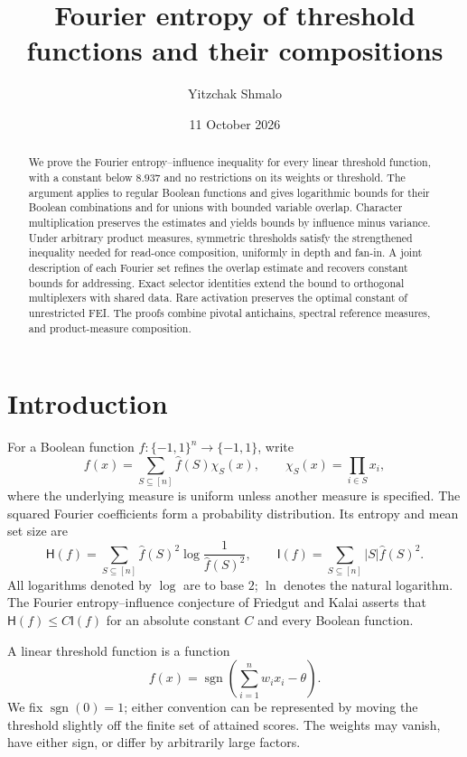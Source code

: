 \documentclass[11pt]{amsart}
\title[Fourier entropy of threshold functions]{Fourier entropy of threshold functions and their compositions}
\author{Yitzchak Shmalo}
\date{11 October 2026}
\theoremstyle{definition}
\theoremstyle{remark}
\newcommand{\bits}{\{-1,1\}}
\newcommand{\HH}{\mathsf H}
\newcommand{\I}{\mathsf I}
\newcommand{\wh}[1]{\widehat{#1}}
\begin{document}
\begin{abstract}
We prove the Fourier entropy--influence inequality for every linear threshold function, with a constant below $8.937$ and no restrictions on its weights or threshold. The argument applies to regular Boolean functions and gives logarithmic bounds for their Boolean combinations and for unions with bounded variable overlap. Character multiplication preserves the estimates and yields bounds by influence minus variance. Under arbitrary product measures, symmetric thresholds satisfy the strengthened inequality needed for read-once composition, uniformly in depth and fan-in. A joint description of each Fourier set refines the overlap estimate and recovers constant bounds for addressing. Exact selector identities extend the bound to orthogonal multiplexers with shared data. Rare activation preserves the optimal constant of unrestricted FEI. The proofs combine pivotal antichains, spectral reference measures, and product-measure composition.
\end{abstract}
\maketitle
\enlargethispage{3pt}

\section{Introduction}

For a Boolean function $f:\bits^n\to\bits$, write
\[
 f(x)=\sum_{S\subseteq[n]}\wh f(S)\chi_S(x),
 \qquad
 \chi_S(x)=\prod_{i\in S}x_i,
\]
where the underlying measure is uniform unless another measure is specified.
The squared Fourier coefficients form a probability distribution. Its entropy and mean set size are
\begin{equation}\label{eq:HI}
 \HH(f)=\sum_{S\subseteq[n]}\wh f(S)^2\log\frac1{\wh f(S)^2},
 \qquad
 \I(f)=\sum_{S\subseteq[n]}|S|\wh f(S)^2.
\end{equation}
All logarithms denoted by $\log$ are to base $2$; $\ln$ denotes the natural logarithm.
The Fourier entropy--influence conjecture of Friedgut and Kalai \cite{FK96} asserts that
$\HH(f)\le C\I(f)$ for an absolute constant $C$ and every Boolean function.

A linear threshold function is a function
\begin{equation}\label{eq:ltf}
 f(x)=\operatorname{sgn}\left(\sum_{i=1}^n w_i x_i-\theta\right).
\end{equation}
We fix $\operatorname{sgn}(0)=1$; either convention can be represented by moving the threshold slightly off the finite set of attained scores. The weights may vanish, have either sign, or differ by arbitrarily large factors.
\end{document}
